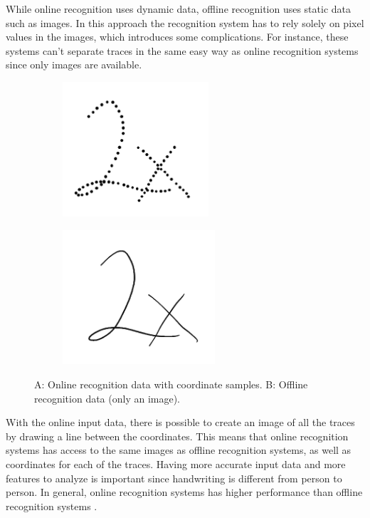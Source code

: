 While online recognition uses dynamic data, offline recognition uses static data such as images. In this approach the recognition system has to rely solely on pixel values in the images, which introduces some complications. For instance, these systems can't separate traces in the same easy way as online recognition systems since only images are available. 

\begin{figure}[H]
\centering
\begin{subfigure}{0.3\textwidth}
\includegraphics[width=1.1\linewidth, height=5cm]{Assets/Chapter2_Theory/segmentation_2_on.png} 
\caption{}
\label{fig:online_data}
\end{subfigure}
\begin{subfigure}{0.3\textwidth}
\includegraphics[width=1.1\linewidth, height=5cm]{Assets/Chapter2_Theory/segmentation_2.png}
\caption{}
\label{fig:offline_data}
\end{subfigure}
\caption{A: Online recognition data with coordinate samples. B: Offline recognition data (only an image).}
\label{fig:online_offline_comparison}
\end{figure}

With the online input data, there is possible to create an image of all the traces by drawing a line between the coordinates. This means that online recognition systems has access to the same images as offline recognition systems, as well as coordinates for each of the traces. Having more accurate input data and more features to analyze is important since handwriting is different from person to person. In general, online recognition systems has higher performance than offline recognition systems \parencite{priya_online_2016}.

